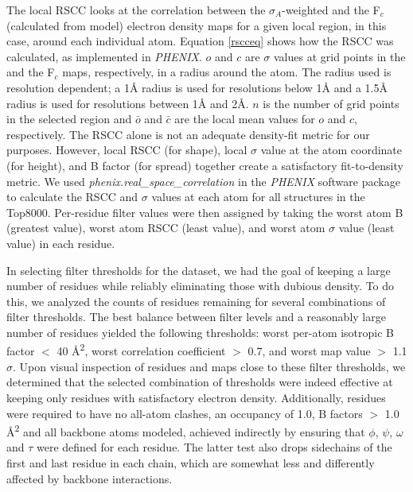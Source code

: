 The local RSCC looks at the correlation between the $\sigma_{A}$-weighted \EDmap{} and the F$_{c}$ (calculated from model) electron density maps for a given local region, in this case, around each individual atom. Equation \ref{rscceq} shows how the RSCC was calculated\textcolor{changecolor}{, as implemented in \textit{PHENIX}}. $o$ and $c$ are $\sigma$ values at grid points in the \EDmap{} and the F$_{c}$ maps, respectively, in a radius around the atom. The radius used is resolution dependent; a 1\AA{} radius is used for resolutions below 1\AA{} and a 1.5\AA{} radius is used for resolutions between 1\AA{} and 2\AA{}. $n$ is the number of grid points in the selected region and $\bar{o}$ and $\bar{c}$ are the local mean values for $o$ and $c$, respectively. The RSCC alone is not an adequate density-fit metric for our purposes. However, local RSCC (for shape), local \EDmap{} $\sigma$ value at the atom coordinate (for height), and B factor (for spread) together create a satisfactory fit-to-density metric. We used \textit{phenix.real\_space\_correlation} in the \textit{PHENIX} software package \citep{Adams:2010fk} to calculate the RSCC and \EDmap{} $\sigma$ values at each atom for all structures in the Top8000. Per-residue filter values were then assigned by taking the worst atom B (greatest value), worst atom RSCC (least value), and worst atom \EDmap{} $\sigma$ value (least value) in each residue.

In selecting filter thresholds for the dataset, we had the goal of keeping a large number of residues while reliably eliminating those with dubious density. To do this, we analyzed the counts of residues remaining for several combinations of filter thresholds. The best balance between filter levels and a reasonably large number of residues yielded the following thresholds: \textcolor{changecolor}{worst per-atom isotropic} B factor $<$ 40 \AA\textsuperscript{2}, worst correlation coefficient $>$ 0.7, and worst map value $>$ 1.1 $\sigma$. Upon visual inspection of residues and maps close to these filter thresholds, we determined that the selected combination of thresholds were indeed effective at keeping only residues with satisfactory electron density. Additionally, residues were required to have no all-atom clashes, an occupancy of 1.0, B factors $>$ 1.0 \AA\textsuperscript{2} and all backbone atoms modeled, achieved indirectly by ensuring that $\phi$, $\psi$, $\omega$ and $\tau$ were defined for each residue.  The latter test also drops sidechains of the first and last residue in each chain, which are somewhat less and differently affected by backbone interactions.

